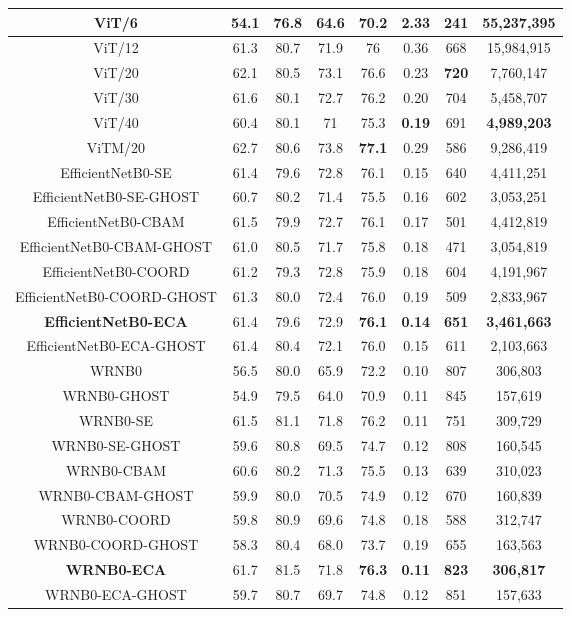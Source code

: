 \documentclass[journal]{IEEEtran}
\begin{document}
\begin{table*}[h!]
\begin{tabular}{c c c c c c c c}
 \hhline{|=|=|=|=|=|=|=|=}
 ViT/6 &54.1 &76.8 &64.6 &70.2 & 2.33 & 241 &55,237,395\\\hline
 ViT/12 & 61.3 &80.7 &71.9 &76 &0.36 &668 & 15,984,915\\ \hline
 ViT/20 & 62.1 & 80.5 & 73.1 & 76.6 &0.23 & \textbf{720} & 7,760,147 \\ \hline
 ViT/30 & 61.6 & 80.1 & 72.7 & 76.2 & 0.20 & 704  &  5,458,707\\ \hline
 ViT/40 & 60.4 & 80.1 & 71 & 75.3 &\textbf{ 0.19} & 691 & \textbf{4,989,203} \\ \hline
 ViTM/20 & 62.7 & 80.6 & 73.8 & \textbf{77.1}& 0.29 &586 & 9,286,419 \\ \hline
 \hhline{|=|=|=|=|=|=|=|=}
  EfficientNetB0-SE & 61.4 & 79.6 & 72.8 & 76.1 & 0.15 & 640 & 4,411,251\\
 \hline
  EfficientNetB0-SE-GHOST & 60.7 & 80.2 & 71.4 & 75.5 & 0.16 & 602 & 3,053,251\\
 \hline
  EfficientNetB0-CBAM & 61.5 & 79.9 & 72.7 & 76.1 & 0.17 & 501 & 4,412,819\\
 \hline
  EfficientNetB0-CBAM-GHOST & 61.0 & 80.5 & 71.7 & 75.8 & 0.18 & 471 & 3,054,819\\
 \hline
  EfficientNetB0-COORD & 61.2 & 79.3 & 72.8 & 75.9 & 0.18 & 604 & 4,191,967\\
 \hline
  EfficientNetB0-COORD-GHOST & 61.3 & 80.0 & 72.4 & 76.0 & 0.19 & 509 & 2,833,967\\
 \hline
  \textbf{EfficientNetB0-ECA} & 61.4 & 79.6 & 72.9 & \textbf{76.1} & \textbf{0.14} & \textbf{651} & \textbf{3,461,663}\\
 \hline
  EfficientNetB0-ECA-GHOST & 61.4 & 80.4 & 72.1 & 76.0 & 0.15 & 611 & 2,103,663\\
 \hhline{|=|=|=|=|=|=|=|=}
  WRNB0 & 56.5 & 80.0 & 65.9 & 72.2 & 0.10 & 807 & 306,803\\
 \hline
  WRNB0-GHOST & 54.9 & 79.5 & 64.0 & 70.9 & 0.11 & 845 & 157,619\\
 \hline
  WRNB0-SE & 61.5 & 81.1 & 71.8 & 76.2 & 0.11 & 751 & 309,729\\
 \hline
  WRNB0-SE-GHOST & 59.6 & 80.8 & 69.5 & 74.7 & 0.12 & 808 & 160,545\\
 \hline
  WRNB0-CBAM & 60.6 & 80.2 & 71.3 & 75.5 & 0.13 & 639 & 310,023\\
 \hline
  WRNB0-CBAM-GHOST & 59.9 & 80.0 & 70.5 & 74.9 & 0.12 & 670 & 160,839\\
 \hline
  WRNB0-COORD & 59.8 & 80.9 & 69.6 & 74.8 & 0.18 & 588 & 312,747\\
 \hline
  WRNB0-COORD-GHOST & 58.3 & 80.4 & 68.0 & 73.7 & 0.19 & 655 & 163,563\\
 \hline
  \textbf{WRNB0-ECA} & 61.7 & 81.5 & 71.8 & \textbf{76.3} & \textbf{0.11} & \textbf{823} & \textbf{306,817}\\
 \hline
  WRNB0-ECA-GHOST & 59.7 & 80.7 & 69.7 & 74.8 & 0.12 & 851 & 157,633\\
 \hline


\end{tabular}
\end{table*}
\end{document}
